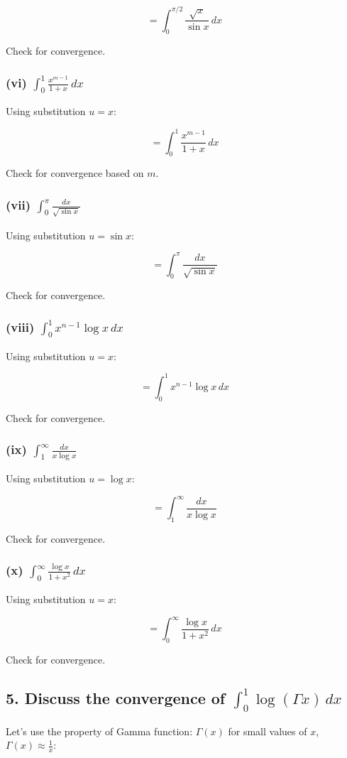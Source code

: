 \documentclass{article}
\begin{document}
\[
= \int_0^{\pi/2} \frac{\sqrt{x}}{\sin x} \, dx
\]


Check for convergence.

\subsubsection*{(vi) \(\int_0^1 \frac{x^{m-1}}{1 + x} \, dx\)}
Using substitution \( u = x \):


\[
= \int_0^1 \frac{x^{m-1}}{1 + x} \, dx
\]


Check for convergence based on \( m \).

\subsubsection*{(vii) \(\int_0^\pi \frac{dx}{\sqrt{\sin x}}\)}
Using substitution \( u = \sin x \):


\[
= \int_0^\pi \frac{dx}{\sqrt{\sin x}}
\]


Check for convergence.

\subsubsection*{(viii) \(\int_0^1 x^{n-1} \log x \, dx\)}
Using substitution \( u = x \):


\[
= \int_0^1 x^{n-1} \log x \, dx
\]


Check for convergence.

\subsubsection*{(ix) \(\int_1^\infty \frac{dx}{x \log x}\)}
Using substitution \( u = \log x \):


\[
= \int_1^\infty \frac{dx}{x \log x}
\]


Check for convergence.

\subsubsection*{(x) \(\int_0^\infty \frac{\log x}{1 + x^2} \, dx\)}
Using substitution \( u = x \):


\[
= \int_0^\infty \frac{\log x}{1 + x^2} \, dx
\]


Check for convergence.


\subsection*{5. Discuss the convergence of \(\int_0^1 \log(\Gamma x) \, dx\)}
Let's use the property of Gamma function: \( \Gamma(x) \) for small values of \( x \), \( \Gamma(x) \approx \frac{1}{x} \):
\end{document}
